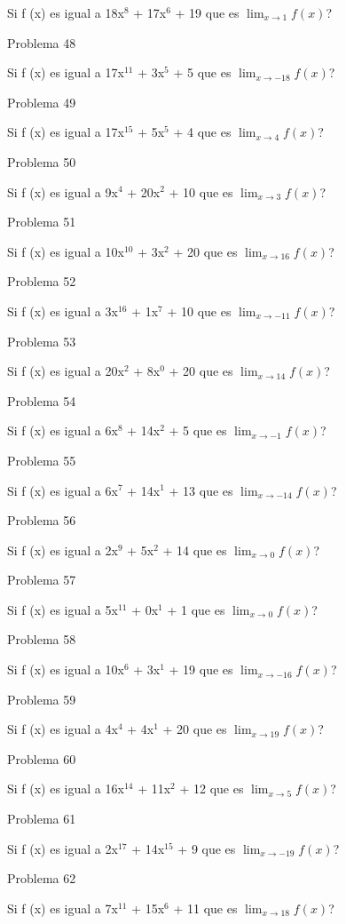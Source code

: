 \documentclass{article}
\begin{document}
Si f (x) es igual a 18x$^{8}$ +  17x${^6}$ + 19 que es $\lim_{x\to 1} f(x) $?

Problema 48

Si f (x) es igual a 17x$^{11}$ +  3x${^5}$ + 5 que es $\lim_{x\to -18} f(x) $?

Problema 49

Si f (x) es igual a 17x$^{15}$ +  5x${^5}$ + 4 que es $\lim_{x\to 4} f(x) $?

Problema 50

Si f (x) es igual a 9x$^{4}$ +  20x${^2}$ + 10 que es $\lim_{x\to 3} f(x) $?

Problema 51

Si f (x) es igual a 10x$^{10}$ +  3x${^2}$ + 20 que es $\lim_{x\to 16} f(x) $?

Problema 52

Si f (x) es igual a 3x$^{16}$ +  1x${^7}$ + 10 que es $\lim_{x\to -11} f(x) $?

Problema 53

Si f (x) es igual a 20x$^{2}$ +  8x${^0}$ + 20 que es $\lim_{x\to 14} f(x) $?

Problema 54

Si f (x) es igual a 6x$^{8}$ +  14x${^2}$ + 5 que es $\lim_{x\to -1} f(x) $?

Problema 55

Si f (x) es igual a 6x$^{7}$ +  14x${^1}$ + 13 que es $\lim_{x\to -14} f(x) $?

Problema 56

Si f (x) es igual a 2x$^{9}$ +  5x${^2}$ + 14 que es $\lim_{x\to 0} f(x) $?

Problema 57

Si f (x) es igual a 5x$^{11}$ +  0x${^1}$ + 1 que es $\lim_{x\to 0} f(x) $?

Problema 58

Si f (x) es igual a 10x$^{6}$ +  3x${^1}$ + 19 que es $\lim_{x\to -16} f(x) $?

Problema 59

Si f (x) es igual a 4x$^{4}$ +  4x${^1}$ + 20 que es $\lim_{x\to 19} f(x) $?

Problema 60

Si f (x) es igual a 16x$^{14}$ +  11x${^2}$ + 12 que es $\lim_{x\to 5} f(x) $?

Problema 61

Si f (x) es igual a 2x$^{17}$ +  14x${^15}$ + 9 que es $\lim_{x\to -19} f(x) $?

Problema 62

Si f (x) es igual a 7x$^{11}$ +  15x${^6}$ + 11 que es $\lim_{x\to 18} f(x) $?
\end{document}
